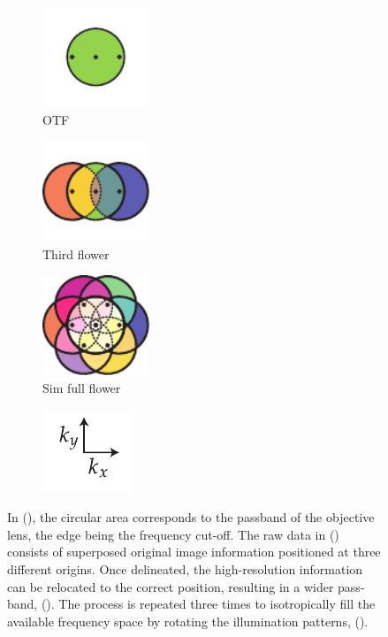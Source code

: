\begin{figure}
    \centering
    \begin{subfigure}{0.25\textwidth}
        \centering
        \includegraphics[height=3cm]{./sim/otf}
        \caption{OTF}
        \label{fig:sim_otf}
    \end{subfigure}
    \begin{subfigure}{0.25\textwidth}
        \centering
        \includegraphics[height=3cm]{./sim/third_flower}
        \caption{Third flower}
        \label{fig:sim_third_flower}
    \end{subfigure}
    \begin{subfigure}{0.25\textwidth}
        \centering
        \includegraphics[height=3cm]{./sim/full_flower_alt}
        \caption{Sim full flower}
        \label{fig:sim_full_flower}
    \end{subfigure}
    \begin{subfigure}{0.15\textwidth}
        \centering
        \includegraphics{./sim/xy_coordinates}
        \label{fig:sim_full_flower}
    \end{subfigure}
    \caption{
        In (), the circular area corresponds to the passband of the objective lens, the edge being the frequency cut-off.
        The raw data in () consists of superposed original image information
        positioned at three different origins.
        Once delineated, the high-resolution information can be relocated to the correct position, resulting in a wider pass-band, ().
        The process is repeated three times to isotropically fill the available frequency space by rotating the illumination patterns, ().
        }
    \label{fig:sim_flowers}
\end{figure}

